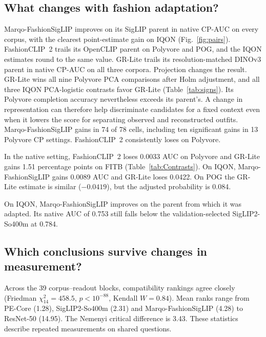 \subsection{What changes with fashion adaptation?}
Marqo-FashionSigLIP improves on its SigLIP parent in native CP-AUC on every corpus, with the clearest point-estimate gain on IQON (Fig.~\ref{fig:pairs}). FashionCLIP~2 trails its OpenCLIP parent on Polyvore and POG, and the IQON estimates round to the same value. GR-Lite trails its resolution-matched DINOv3 parent in native CP-AUC on all three corpora. Projection changes the result. GR-Lite wins all nine Polyvore PCA comparisons after Holm adjustment, and all three IQON PCA-logistic contrasts favor GR-Lite (Table~\ref{tab:signs}). Its Polyvore completion accuracy nevertheless exceeds its parent's. A change in representation can therefore help discriminate candidates for a fixed context even when it lowers the score for separating observed and reconstructed outfits.
Marqo-FashionSigLIP gains in 74 of 78 cells, including ten significant gains in 13 Polyvore CP settings. FashionCLIP~2 consistently loses on Polyvore.


\showContrasts
In the native setting, FashionCLIP~2 loses 0.0033 AUC on Polyvore and GR-Lite gains 1.51 percentage points on FITB (Table~\ref{tab:Contrasts}). On IQON, Marqo-FashionSigLIP gains 0.0089 AUC and GR-Lite loses 0.0422. On POG the GR-Lite estimate is similar ($-0.0419$), but the adjusted probability is 0.084.

On IQON, Marqo-FashionSigLIP improves on the parent from which it was adapted. Its native AUC of 0.753 still falls below the validation-selected SigLIP2-So400m at 0.784.

\subsection{Which conclusions survive changes in measurement?}
Across the 39 corpus--readout blocks, compatibility rankings agree closely (Friedman $\chi^2_{14}=458.5$, $p<10^{-88}$, Kendall $W=0.84$). Mean ranks range from PE-Core (1.28), SigLIP2-So400m (2.31) and Marqo-FashionSigLIP (4.28) to ResNet-50 (14.95). The Nemenyi critical difference is 3.43. These statistics describe repeated measurements on shared questions.

